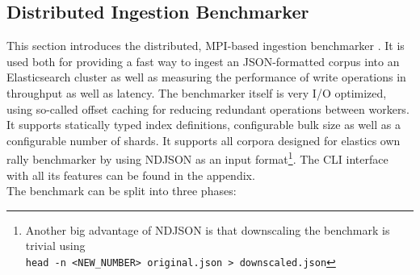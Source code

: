 \newpage

\subsection{Distributed Ingestion Benchmarker}
This section introduces the distributed, \ac{MPI}-based ingestion benchmarker \cite{myingestion}. It is used both for providing a fast way to ingest an \ac{JSON}-formatted corpus into an Elasticsearch cluster as well as measuring the performance of write operations in throughput as well as latency. The benchmarker itself is very I/O optimized, using so-called offset caching for reducing redundant operations between workers. It supports statically typed index definitions, configurable bulk size as well as a configurable number of shards. It supports all corpora designed for elastics own rally benchmarker by using \ac{NDJSON} as an input format\footnote{Another big advantage of \ac{NDJSON} is that downscaling the benchmark is trivial using\\\texttt{head -n <NEW\_NUMBER> original.json > downscaled.json}}. The \ac{CLI} interface with all its features can be found in the appendix.\\

The benchmark can be split into three phases:

